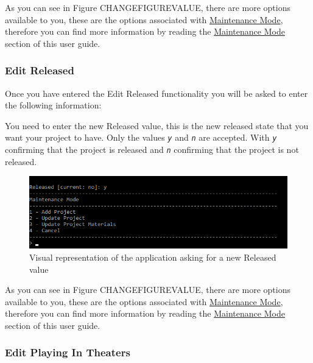 \documentclass[
  english,
  a4paper,
,tablecaptionabove
]{scrartcl}
\begin{document}
As you can see in Figure CHANGEFIGUREVALUE, there are more options
available to you, these are the options associated with
\protect\hyperlink{using-maintenance-mode}{Maintenance Mode}, therefore
you can find more information by reading the
\protect\hyperlink{using-maintenance-mode}{Maintenance Mode} section of
this user guide.

\newpage

\hypertarget{edit-released-1}{%
\subsubsection{Edit Released}\label{edit-released-1}}

Once you have entered the Edit Released functionality you will be asked
to enter the following information:

You need to enter the new Released value, this is the new released state
that you want your project to have. Only the values \emph{\texttt{y}}
and \emph{\texttt{n}} are accepted. With \emph{\texttt{y}} confirming
that the project is released and \emph{\texttt{n}} confirming that the
project is not released.

\begin{figure}
\centering
\includegraphics{images/user-guide/maintenance-mode/update-project-released.png}
\caption{Visual representation of the application asking for a new
Released value}
\end{figure}

As you can see in Figure CHANGEFIGUREVALUE, there are more options
available to you, these are the options associated with
\protect\hyperlink{using-maintenance-mode}{Maintenance Mode}, therefore
you can find more information by reading the
\protect\hyperlink{using-maintenance-mode}{Maintenance Mode} section of
this user guide.

\newpage

\hypertarget{edit-playing-in-theaters-1}{%
\subsubsection{Edit Playing In
Theaters}\label{edit-playing-in-theaters-1}}
\end{document}
